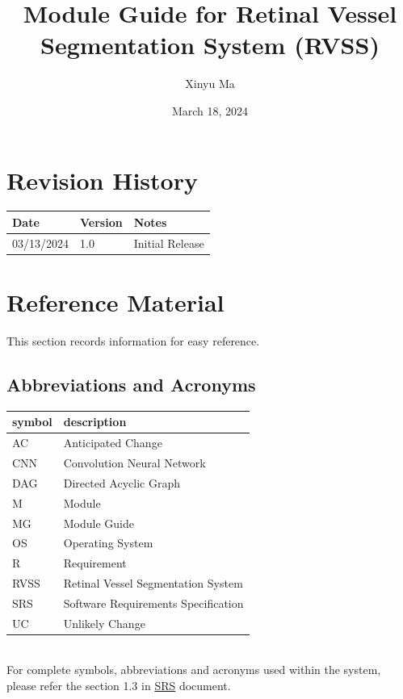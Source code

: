 \documentclass[12pt, titlepage]{article}
\begin{document}
\title{Module Guide for Retinal Vessel Segmentation System (RVSS)}
 
\author{Xinyu Ma}
\date{March 18, 2024}

\maketitle


\section{Revision History}

\begin{tabularx}{\textwidth}{p{3cm}p{2cm}X}
\toprule {\bf Date} & {\bf Version} & {\bf Notes}\\
\midrule
03/13/2024 & 1.0 & Initial Release  \\

\bottomrule
\end{tabularx}

\newpage

\section{Reference Material}

This section records information for easy reference.

\subsection{Abbreviations and Acronyms}

\renewcommand{\arraystretch}{1.2}
\begin{tabular}{l l} 
  \toprule		
  \textbf{symbol} & \textbf{description}\\
  \midrule 
  AC & Anticipated Change\\
  CNN & Convolution Neural Network\\
  DAG & Directed Acyclic Graph \\
  M & Module \\
  MG & Module Guide \\
  OS & Operating System \\
  R & Requirement\\
  RVSS & Retinal Vessel Segmentation System \\ 
  SRS & Software Requirements Specification\\
  UC & Unlikely Change \\
  \bottomrule
\end{tabular}\\
For complete symbols, abbreviations and acronyms used within the system, please refer the section 1.3 in \href{https://github.com/lele0007/Blood-vessel-segmentation/blob/main/docs/SRS/SRS.pdf}{SRS} document.
\newpage
\end{document}
